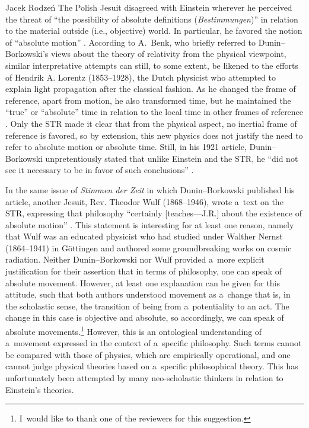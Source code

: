 \begin{artengenv}{Jacek Rodzeń}
The Polish Jesuit disagreed with Einstein wherever he perceived the threat of ``the possibility of absolute definitions (\textit{Bestimmungen})''
\parencite[][p.214]{dunin-borkowski_neue_1921} %
 in relation to the material outside (i.e., objective) world. In particular, he favored the notion of ``absolute motion'' 
\parencite*[][p.213]{dunin-borkowski_neue_1921}. %
 According to A.~Benk, who briefly referred to Dunin–Borkowski's views about the theory of relativity from the physical viewpoint, similar interpretative attempts can still, to some extent, be likened to the efforts of Hendrik A. Lorentz (1853–1928), the Dutch physicist who attempted to explain light propagation after the classical fashion. As he changed the frame of reference, apart from motion, he also transformed time, but he maintained the ``true'' or ``absolute'' time in relation to the local time in other frames of reference 
\parencites[][p.123]{benk_moderne_2000}[cf. also][p.440]{wroblewski_historia_2006}. %
 Only the STR made it clear that from the physical aspect, no inertial frame of reference is favored, so by extension, this new physics does not justify the need to refer to absolute motion or absolute time. Still, in his 1921 article, Dunin–Borkowski unpretentiously stated that unlike Einstein and the STR, he ``did not see it necessary to be in favor of such conclusions'' 
\parencite[][p.214]{dunin-borkowski_neue_1921}.%


In the same issue of \textit{Stimmen der Zeit} in which Dunin–Borkowski published his article, another Jesuit, Rev. Theodor Wulf (1868–1946), wrote a~text on the STR, expressing that philosophy ``certainly [teaches---J.R.] about the existence of absolute motion''
\parencite[][p.115]{wulf_pu1}. %
 This statement is interesting for at least one reason, namely that Wulf was an educated physicist who had studied under Walther Nernst (1864–1941) in Göttingen and authored some groundbreaking works on cosmic radiation. Neither Dunin–Borkowski nor Wulf provided a~more explicit justification for their assertion that in terms of philosophy, one can speak of absolute movement. However, at least one explanation can be given for this attitude, such that both authors understood movement as a~change that is, in the scholastic sense, the transition of being from a~potentiality to an act. The change in this case is objective and absolute, so accordingly, we can speak of absolute movements.\footnote{I~would like to thank one of the reviewers for this suggestion.} However, this is an ontological understanding of a~movement expressed in the context of a~specific philosophy. Such terms cannot be compared with those of physics, which are empirically operational, and one cannot judge physical theories based on a~specific philosophical theory. This has unfortunately been attempted by many neo-scholastic thinkers in relation to Einstein's theories.


\end{artengenv}
